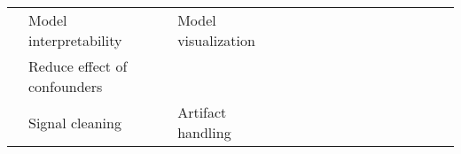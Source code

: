 \begin{tabular}{p{1.5cm}p{1.5cm}p{1.5cm}p{1.5cm}p{0.6cm}p{0.6cm}p{0.6cm}p{0.6cm}p{0.6cm}p{0.6cm}p{0.6cm}p{0.6cm}p{0.6cm}p{0.6cm}p{0.6cm}}
                                & Model interpretability & Model visualization &   &                                                             &                                                                                                        \cite{Hartmann2018b} &                                                                        &                                      &                                                            &                      &                         &              \cite{Sturm2016} &                     &                         &                                                                      \\
                                & Reduce effect of confounders &   &   &                                                             &                                                                                                                             &                                                                        &                                      &                                                            &                      &                         &                               &                     &                         &                                                        \cite{Wu2018} \\
                                & Signal cleaning & Artifact handling &   &                                  \cite{Yang2018, Yang2016a} &                                                                                                            \cite{Wang2018a} &                                                                        &                                      &                                                            &                      &  \cite{drouin2016using} &                               &                     &                         &                                                   \cite{Pardede2015} \\
\bottomrule
\end{tabular}
